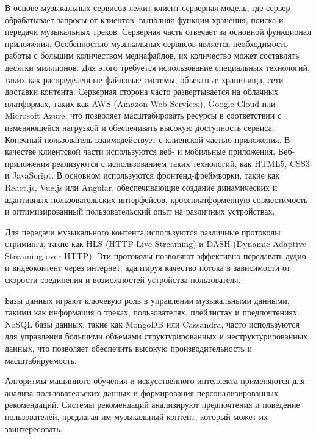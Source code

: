 В основе музыкальных сервисов лежит клиент-серверная модель, где сервер обрабатывает запросы от клиентов, выполняя функции хранения, поиска и передачи музыкальных треков. 
Серверная часть отвечает за основной функционал приложения. Особенностью музыкальных сервисов является необходимость работы с большим количеством медиафайлов, их количество может составлять десятки миллионов. Для этого требуется использование специальных технологий, таких как распределенные файловые системы, объектные хранилища, сети доставки контента. Серверная сторона часто развертывается на облачных платформах, таких как AWS (Amazon Web Services), Google Cloud или Microsoft Azure, что позволяет масштабировать ресурсы в соответствии с изменяющейся нагрузкой и обеспечивать высокую доступность сервиса.
Конечный пользователь взаимодействует с клиенской частью приложения. В качестве клиентской части используются веб- и мобильные приложения.
Веб-приложения реализуются с использованием таких технологий, как HTML5, CSS3 и JavaScript. В основном используются фронтенд-фреймворки,  такие как React.js, Vue.js или Angular, обеспечивающие создание динамических и адаптивных пользовательских интерфейсов, кроссплатформенную совместимость и оптимизированный пользовательский опыт на различных устройствах. 

Для передачи музыкального контента используются различные протоколы стриминга, такие как HLS (HTTP Live Streaming) и DASH (Dynamic Adaptive Streaming over HTTP). Эти протоколы позволяют эффективно передавать аудио- и видеоконтент через интернет, адаптируя качество потока в зависимости от скорости соединения и возможностей устройства пользователя.

Базы данных играют ключевую роль в управлении музыкальными данными, такими как информация о треках, пользователях, плейлистах и предпочтениях. NoSQL базы данных, такие как MongoDB или Cassandra, часто используются для управления большими объемами структурированных и неструктурированных данных, что позволяет обеспечить высокую производительность и масштабируемость.

Алгоритмы машинного обучения и искусственного интеллекта применяются для анализа пользовательских данных и формирования персонализированных рекомендаций. Системы рекомендаций анализируют предпочтения и поведение пользователей, предлагая им музыкальный контент, который может их заинтересовать.